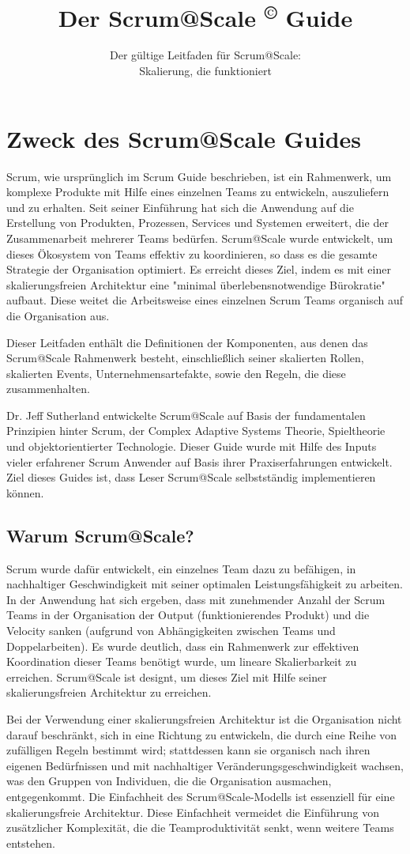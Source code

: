 \documentclass[12pt,a4paper,parskip=full]{scrartcl}
\title{\Huge{\color{red}\textbf{Der Scrum@Scale
\textsuperscript{\copyright}
Guide}}}
\subtitle{\color{gray}Der gültige Leitfaden für Scrum@Scale:\\ Skalierung, die funktioniert}
\date{}
\begin{document}

\section{Zweck des Scrum@Scale Guides}
Scrum, wie ursprünglich im Scrum Guide beschrieben, ist ein Rahmenwerk,
um komplexe Produkte mit Hilfe eines einzelnen Teams zu entwickeln,
auszuliefern und zu erhalten. Seit seiner Einführung hat sich die Anwendung
auf die Erstellung von Produkten, Prozessen, Services und Systemen erweitert,
die der Zusammenarbeit mehrerer Teams bedürfen. Scrum@Scale wurde entwickelt,
um dieses Ökosystem von Teams effektiv zu koordinieren, so dass es die gesamte
Strategie der Organisation optimiert. Es erreicht dieses Ziel, indem es mit
einer skalierungsfreien Architektur eine "minimal überlebensnotwendige
Bürokratie" aufbaut. Diese weitet die Arbeitsweise eines einzelnen Scrum Teams
organisch auf die Organisation aus.

Dieser Leitfaden enthält die Definitionen der Komponenten, aus denen das
Scrum@Scale Rahmenwerk besteht, einschließlich seiner skalierten Rollen,
skalierten Events, Unternehmensartefakte, sowie den Regeln, die diese
zusammenhalten.

Dr. Jeff Sutherland entwickelte Scrum@Scale auf Basis der fundamentalen
Prinzipien hinter Scrum, der Complex Adaptive Systems Theorie, Spieltheorie und
objektorientierter Technologie. Dieser Guide wurde mit Hilfe des Inputs vieler
erfahrener Scrum Anwender auf Basis ihrer Praxiserfahrungen entwickelt. Ziel
dieses Guides ist, dass Leser Scrum@Scale selbstständig implementieren können.

\subsection{Warum Scrum@Scale?}
Scrum wurde dafür entwickelt, ein einzelnes Team dazu zu befähigen, in
nachhaltiger Geschwindigkeit mit seiner optimalen Leistungsfähigkeit zu
arbeiten. In der Anwendung hat sich ergeben, dass mit zunehmender Anzahl der
Scrum Teams in der Organisation der Output (funktionierendes Produkt) und die
Velocity sanken (aufgrund von Abhängigkeiten zwischen Teams und Doppelarbeiten).
Es wurde deutlich, dass ein Rahmenwerk zur effektiven Koordination dieser Teams
benötigt wurde, um lineare Skalierbarkeit zu erreichen. Scrum@Scale ist designt,
um dieses Ziel mit Hilfe seiner skalierungsfreien Architektur zu erreichen.


Bei der Verwendung einer skalierungsfreien Architektur ist die Organisation
nicht darauf beschränkt, sich in eine Richtung zu entwickeln, die durch eine
Reihe von zufälligen Regeln bestimmt wird; stattdessen kann sie organisch nach
ihren eigenen Bedürfnissen und mit nachhaltiger Veränderungsgeschwindigkeit
wachsen, was den Gruppen von Individuen, die die Organisation ausmachen,
entgegenkommt. Die Einfachheit des Scrum@Scale-Modells ist essenziell für eine
skalierungsfreie Architektur. Diese Einfachheit vermeidet die Einführung von
zusätzlicher Komplexität, die die Teamproduktivität senkt, wenn weitere Teams
entstehen.
\end{document}
